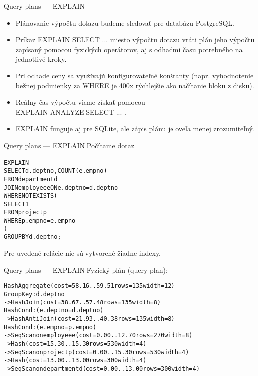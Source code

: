 \documentclass[12pt]{beamer}
\def\blue#1{\textcolor{Cerulean}{#1}}
\begin{document}
\begin{frame}[fragile]{Query plans --- EXPLAIN}
\begin{itemize}
  \item Plánovanie výpočtu dotazu budeme sledovať pre databázu PostgreSQL.
  \item Príkaz EXPLAIN SELECT ... miesto výpočtu dotazu vráti
      plán jeho výpočtu zapísaný pomocou fyzických operátorov,
      aj s odhadmi času potrebného na jednotlivé kroky.
  \item Pri odhade ceny sa využívajú konfigurovateľné konštanty
  (napr. vyhodnotenie bežnej podmienky za WHERE je 400x rýchlejšie ako načítanie bloku z disku).
  \item Reálny čas výpočtu vieme získať pomocou\\ EXPLAIN ANALYZE SELECT ... .
  \item EXPLAIN funguje aj pre SQLite, ale zápis plánu je oveľa menej zrozumiteľný.
\end{itemize}
\end{frame}

\begin{frame}[fragile]{Query plans --- EXPLAIN}
Počítame dotaz
\begin{alltt}
\alert{EXPLAIN}\blue{
SELECT d.deptno, COUNT(e.empno)
FROM department d
JOIN employee e ON e.deptno = d.deptno
WHERE NOT EXISTS (
    SELECT 1
    FROM project p
    WHERE p.empno = e.empno
)
GROUP BY d.deptno;
}
\end{alltt}
Pre uvedené relácie nie sú vytvorené žiadne indexy.
\end{frame}

\begin{frame}[fragile]{Query plans --- EXPLAIN}
Fyzický plán (query plan):
\bigskip

\scriptsize
\begin{alltt}
HashAggregate  (cost=58.16..59.51 rows=135 width=12)
  Group Key: d.deptno
  ->  Hash Join  (cost=38.67..57.48 rows=135 width=8)
        Hash Cond: (e.deptno = d.deptno)
        ->  Hash Anti Join  (cost=21.93..40.38 rows=135 width=8)
              Hash Cond: (e.empno = p.empno)
              ->  Seq Scan on employee e  (cost=0.00..12.70 rows=270 width=8)
              ->  Hash  (cost=15.30..15.30 rows=530 width=4)
                    ->  Seq Scan on project p  (cost=0.00..15.30 rows=530 width=4)
        ->  Hash  (cost=13.00..13.00 rows=300 width=4)
              ->  Seq Scan on department d  (cost=0.00..13.00 rows=300 width=4)
\end{alltt}
\end{frame}
\end{document}
